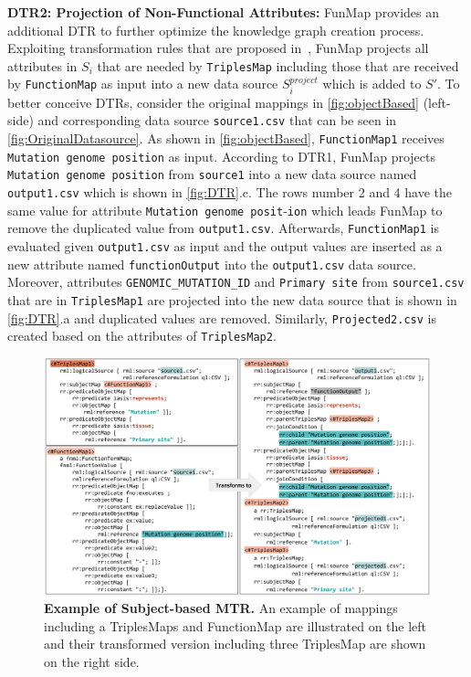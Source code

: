\noindent\textbf{DTR2: Projection of Non-Functional Attributes:}
FunMap provides an additional DTR to further optimize the knowledge graph creation process. Exploiting transformation rules that are proposed in~\cite{jozashoori2019mapsdi}, FunMap projects all attributes in $S_i$ that are needed by \verb|TriplesMap| including those that are received by \verb|FunctionMap| as input into a new data source $S_i^{project}$ which is added to $S'$. 
To better conceive DTRs, consider the original mappings in \autoref{fig:objectBased} (left-side) and corresponding data source \verb|source1.csv| that can be seen in \autoref{fig:OriginalDatasource}. As shown in \autoref{fig:objectBased}, \verb|FunctionMap1| receives \verb|Mutation genome position| as input. According to DTR1, FunMap projects \verb|Mutation genome position| from \verb|source1| into a new data source named \verb|output1.csv| which is shown in \autoref{fig:DTR}.c. The rows number 2 and 4 have the same value for attribute \verb|Mutation genome posit|-\verb|ion| which leads FunMap to remove the duplicated value from \verb|output1.csv|. Afterwards, \verb|FunctionMap1| is evaluated given \verb|output1.csv| as input and the output values are inserted as a new attribute named \verb|functionOutput| into the \verb|output1.csv| data source. Moreover, attributes \verb|GENOMIC_MUTATION_ID| and \verb|Primary site| from \verb|source1.csv| that are in \verb|TriplesMap1| are projected into the new data source that is shown in \autoref{fig:DTR}.a and duplicated values are removed. Similarly, \verb|Projected2.csv| is created based on the attributes of \verb|TriplesMap2|.
\begin{figure}[t!]
\includegraphics[width=\textwidth]{figures/MTR_subjectBased.png}
\caption{\textbf{Example of Subject-based MTR.} An example of mappings including a TriplesMaps and FunctionMap are illustrated on the left and their transformed version including three TriplesMap are shown on the right side.} 
\label{fig:subjectBased}
\end{figure}
